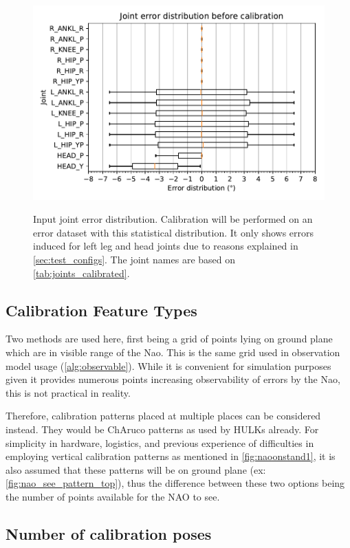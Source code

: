 \documentclass[english, printversion, nomenclature, notitle]{tuvisionthesis} %
\begin{document}
\begin{figure}
	\includegraphics[width=\columnwidth]{error_input.pdf}
	\label{fig:error_config_distrib}
	\caption{Input joint error distribution. Calibration will be performed on an error dataset with this statistical distribution. It only shows errors induced for left leg and head joints due to reasons explained in \cref{sec:test_configs}. The joint names are based on \cref{tab:joints_calibrated}.}
\end{figure}

\subsection{Calibration Feature Types}

Two methods are used here, first being a grid of points lying on ground plane which are in visible range of the Nao. This is the same grid used in observation model usage (\cref{alg:observable}). While it is convenient for simulation purposes given it provides numerous points increasing observability of errors by the Nao, this is not practical in reality.

Therefore, calibration patterns placed at multiple places can be considered instead. They would be ChAruco patterns as used by HULKs already. For simplicity in hardware, logistics, and previous experience of difficulties in employing vertical calibration patterns as mentioned in \cref{fig:naoonstand1}, it is also assumed that these patterns will be on ground plane (ex: \cref{fig:nao_see_pattern_top}), thus the difference between these two options being the number of points available for the NAO to see.

\subsection{Number of calibration poses}
\end{document}
